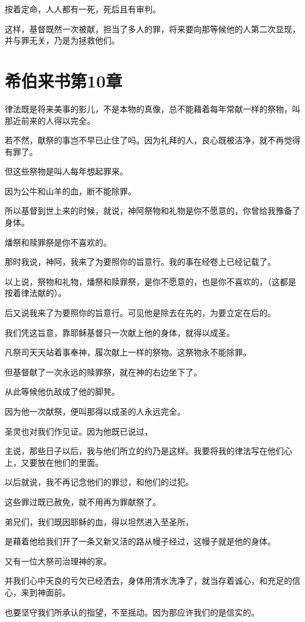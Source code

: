 \documentclass[12pt,oneside]{book}
\begin{document}
按着定命，人人都有一死，死后且有审判。

这样，基督既然一次被献，担当了多人的罪，将来要向那等候他的人第二次显现，并与罪无关，乃是为拯救他们。

\chapter{希伯来书第10章}
律法既是将来美事的影儿，不是本物的真像，总不能藉着每年常献一样的祭物，叫那近前来的人得以完全。

若不然，献祭的事岂不早已止住了吗。因为礼拜的人，良心既被洁净，就不再觉得有罪了。

但这些祭物是叫人每年想起罪来。

因为公牛和山羊的血，断不能除罪。

所以基督到世上来的时候，就说，神阿祭物和礼物是你不愿意的，你曾给我豫备了身体。

燔祭和赎罪祭是你不喜欢的。

那时我说，神阿，我来了为要照你的旨意行。我的事在经卷上已经记载了。

以上说，祭物和礼物，燔祭和赎罪祭，是你不愿意的，也是你不喜欢的，（这都是按着律法献的）。

后又说我来了为要照你的旨意行。可见他是除去在先的，为要立定在后的。

我们凭这旨意，靠耶稣基督只一次献上他的身体，就得以成圣。

凡祭司天天站着事奉神，履次献上一样的祭物。这祭物永不能除罪。

但基督献了一次永远的赎罪祭，就在神的右边坐下了。

从此等候他仇敌成了他的脚凳。

因为他一次献祭，便叫那得以成圣的人永远完全。

圣灵也对我们作见证。因为他既已说过，

主说，那些日子以后，我与他们所立的约乃是这样。我要将我的律法写在他们心上，又要放在他们的里面。

以后就说，我不再记念他们的罪愆，和他们的过犯。

这些罪过既已赦免，就不用再为罪献祭了。

弟兄们，我们既因耶稣的血，得以坦然进入至圣所，

是藉着他给我们开了一条又新又活的路从幔子经过，这幔子就是他的身体。

又有一位大祭司治理神的家。

并我们心中天良的亏欠已经洒去，身体用清水洗净了，就当存着诚心，和充足的信心，来到神面前。

也要坚守我们所承认的指望，不至摇动。因为那应许我们的是信实的。
\end{document}
